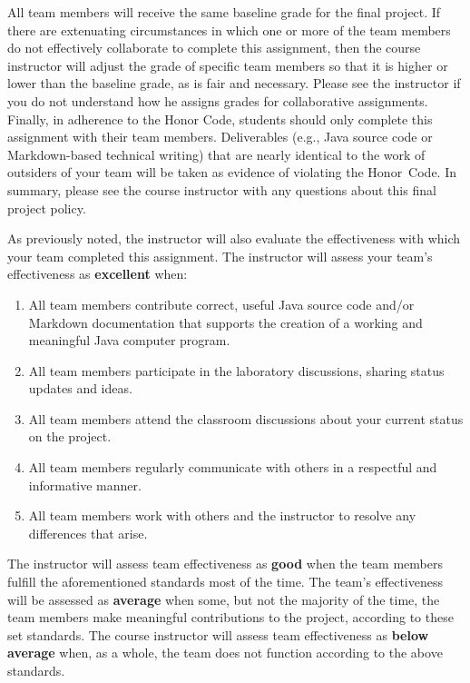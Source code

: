 \documentclass[11pt]{article}
\begin{document}
All team members will receive the same baseline grade for the final project. If
there are extenuating circumstances in which one or more of the team members do
not effectively collaborate to complete this assignment, then the course
instructor will adjust the grade of specific team members so that it is higher
or lower than the baseline grade, as is fair and necessary. Please see the
instructor if you do not understand how he assigns grades for collaborative
assignments. Finally, in adherence to the Honor Code, students should only
complete this assignment with their team members. Deliverables (e.g., Java
source code or Markdown-based technical writing) that are nearly identical to
the work of outsiders of your team will be taken as evidence of violating the
\mbox{Honor Code}. In summary, please see the course instructor with any
questions about this final project policy.

As previously noted, the instructor will also evaluate the effectiveness with
which your team completed this assignment. The instructor will assess your
team's effectiveness as {\bf excellent} when:

\vspace*{-.5em}

\begin{enumerate}
  \setlength{\itemsep}{0pt}

\item All team members contribute correct, useful Java source code and/or
  Markdown documentation that supports the creation of a working and meaningful
  Java computer program.

\item All team members participate in the laboratory discussions, sharing status
  updates and ideas.

\item All team members attend the classroom discussions about your current
  status on the project.

\item All team members regularly communicate with others in a respectful and
  informative manner.

\item All team members work with others and the instructor to resolve any
  differences that arise.

\end{enumerate}

\vspace*{-.5em}

The instructor will assess team effectiveness as {\bf good} when the team
members fulfill the aforementioned standards most of the time. The team's
effectiveness will be assessed as {\bf average} when some, but not the majority
of the time, the team members make meaningful contributions to the project,
according to these set standards. The course instructor will assess team
effectiveness as {\bf below average} when, as a whole, the team does not
function according to the above standards.
\end{document}

